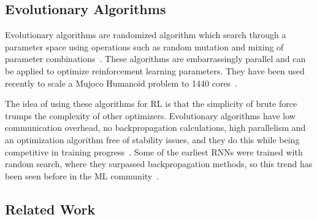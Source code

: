 \subsection{Evolutionary Algorithms}

Evolutionary algorithms are randomized algorithm which search through a
parameter space using operations such as random mutation and mixing of
parameter combinations~\cite{man1996genetic}. These algorithms are
embarrassingly parallel and can be applied to optimize reinforcement learning
parameters. They have been used recently to scale a Mujoco Humanoid problem to
1440 cores~\cite{salimans2017evolution}.

The idea of using these algorithms for RL is that the simplicity of brute
force trumps the complexity of other optimizers. Evolutionary algorithms have
low communication overhead, no backpropagation calculations, high parallelism
and an optimization algorithm free of stability issues, and they do this while
being competitive in training progress~\cite{salimans2017evolution}. Some of
the earliest RNNs were trained with random search, where they surpassed
backpropagation methods, so this trend has been seen before in the ML
community~\cite{hochreiter1997long}.

\subsection{Related Work}


